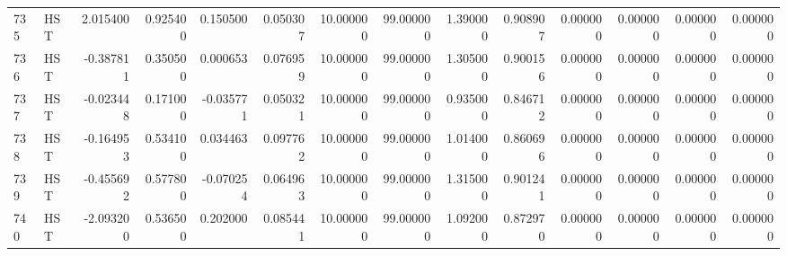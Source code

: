 \begin{tabular}{llrrrrrrrrrrrr}
735 &    HST &  2.015400 &      0.925400 &  0.150500 &    0.050307 &  10.000000 &     99.000000 &   1.390000 &  0.908907 &  0.000000 &   0.000000 &     0.000000 &     0.000000 \\
736 &    HST & -0.387811 &      0.350500 &  0.000653 &    0.076959 &  10.000000 &     99.000000 &   1.305000 &  0.900156 &  0.000000 &   0.000000 &     0.000000 &     0.000000 \\
737 &    HST & -0.023448 &      0.171000 & -0.035771 &    0.050321 &  10.000000 &     99.000000 &   0.935000 &  0.846712 &  0.000000 &   0.000000 &     0.000000 &     0.000000 \\
738 &    HST & -0.164953 &      0.534100 &  0.034463 &    0.097762 &  10.000000 &     99.000000 &   1.014000 &  0.860696 &  0.000000 &   0.000000 &     0.000000 &     0.000000 \\
739 &    HST & -0.455692 &      0.577800 & -0.070254 &    0.064963 &  10.000000 &     99.000000 &   1.315000 &  0.901241 &  0.000000 &   0.000000 &     0.000000 &     0.000000 \\
740 &    HST & -2.093200 &      0.536500 &  0.202000 &    0.085441 &  10.000000 &     99.000000 &   1.092000 &  0.872970 &  0.000000 &   0.000000 &     0.000000 &     0.000000 \\
\bottomrule
\end{tabular}
